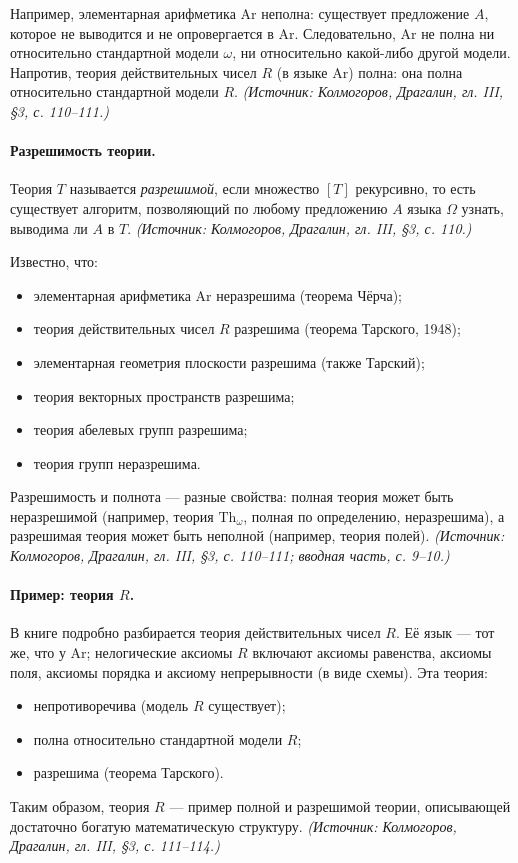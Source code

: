 \documentclass[a4paper,12pt]{article}
\begin{document}
Например, элементарная арифметика \(\mathrm{Ar}\) неполна: существует предложение \(A\), которое не выводится и не опровергается в \(\mathrm{Ar}\). Следовательно, \(\mathrm{Ar}\) не полна ни относительно стандартной модели \(\omega\), ни относительно какой-либо другой модели. Напротив, теория действительных чисел \(R\) (в языке \(\mathrm{Ar}\)) полна: она полна относительно стандартной модели \(R\).
\textit{(Источник: Колмогоров, Драгалин, гл. III, §3, с. 110--111.)}

\paragraph{Разрешимость теории.} Теория \(T\) называется \emph{разрешимой}, если множество \([T]\) рекурсивно, то есть существует алгоритм, позволяющий по любому предложению \(A\) языка \(\Omega\) узнать, выводима ли \(A\) в \(T\).
\textit{(Источник: Колмогоров, Драгалин, гл. III, §3, с. 110.)}

Известно, что:
\begin{itemize}
\item элементарная арифметика \(\mathrm{Ar}\) неразрешима (теорема Чёрча);
\item теория действительных чисел \(R\) разрешима (теорема Тарского, 1948);
\item элементарная геометрия плоскости разрешима (также Тарский);
\item теория векторных пространств разрешима;
\item теория абелевых групп разрешима;
\item теория групп неразрешима.
\end{itemize}
Разрешимость и полнота --- разные свойства: полная теория может быть неразрешимой (например, теория \(\mathrm{Th}_\omega\), полная по определению, неразрешима), а разрешимая теория может быть неполной (например, теория полей).
\textit{(Источник: Колмогоров, Драгалин, гл. III, §3, с. 110--111; вводная часть, с. 9--10.)}

\paragraph{Пример: теория \(R\).} В книге подробно разбирается теория действительных чисел \(R\). Её язык --- тот же, что у \(\mathrm{Ar}\); нелогические аксиомы \(R\) включают аксиомы равенства, аксиомы поля, аксиомы порядка и аксиому непрерывности (в виде схемы). Эта теория:
\begin{itemize}
\item непротиворечива (модель \(R\) существует);
\item полна относительно стандартной модели \(R\);
\item разрешима (теорема Тарского).
\end{itemize}
Таким образом, теория \(R\) --- пример полной и разрешимой теории, описывающей достаточно богатую математическую структуру.
\textit{(Источник: Колмогоров, Драгалин, гл. III, §3, с. 111--114.)}
\end{document}

